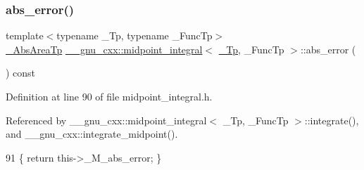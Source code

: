 \subsubsection{\texorpdfstring{abs\+\_\+error()}{abs\_error()}}
{\footnotesize\ttfamily template$<$typename \+\_\+\+Tp, typename \+\_\+\+Func\+Tp$>$ \\
\hyperlink{class____gnu__cxx_1_1midpoint__integral_ae4c2b0cff4d7385e5c046ec4400bc69e}{\+\_\+\+Abs\+Area\+Tp} \hyperlink{class____gnu__cxx_1_1midpoint__integral}{\+\_\+\+\_\+gnu\+\_\+cxx\+::midpoint\+\_\+integral}$<$ \hyperlink{namespace____gnu__cxx_a3b19a9c800ca194374ef9172290f7d79}{\+\_\+\+Tp}, \+\_\+\+Func\+Tp $>$\+::abs\+\_\+error (\begin{DoxyParamCaption}{ }\end{DoxyParamCaption}) const\hspace{0.3cm}{\ttfamily [inline]}}



Definition at line 90 of file midpoint\+\_\+integral.\+h.



Referenced by \+\_\+\+\_\+gnu\+\_\+cxx\+::midpoint\+\_\+integral$<$ \+\_\+\+Tp, \+\_\+\+Func\+Tp $>$\+::integrate(), and \+\_\+\+\_\+gnu\+\_\+cxx\+::integrate\+\_\+midpoint().


\begin{DoxyCode}
91       \{ \textcolor{keywordflow}{return} this->\_M\_abs\_error; \}
\end{DoxyCode}
\mbox{\label{class____gnu__cxx_1_1midpoint__integral_ae991ad240c41205cbe4e68ef59bc6ca8}} 

